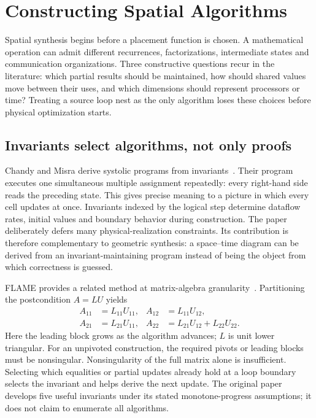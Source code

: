 \documentclass[final,3p,times,authoryear]{elsarticle}
\begin{document}
\section{Constructing Spatial Algorithms}\label{sec:constructive}
Spatial synthesis begins before a placement function is chosen. A mathematical operation can admit different recurrences, factorizations, intermediate states and communication organizations. Three constructive questions recur in the literature: which partial results should be maintained, how should shared values move between their uses, and which dimensions should represent processors or time? Treating a source loop nest as the only algorithm loses these choices before physical optimization starts.

\subsection{Invariants select algorithms, not only proofs}
Chandy and Misra derive systolic programs from invariants~\citep{chandy1986}. Their program executes one simultaneous multiple assignment repeatedly: every right-hand side reads the preceding state. This gives precise meaning to a picture in which every cell updates at once. Invariants indexed by the logical step determine dataflow rates, initial values and boundary behavior during construction. The paper deliberately defers many physical-realization constraints. Its contribution is therefore complementary to geometric synthesis: a space--time diagram can be derived from an invariant-maintaining program instead of being the object from which correctness is guessed.

FLAME provides a related method at matrix-algebra granularity~\citep{gunnels2001}. Partitioning the postcondition $A=LU$ yields
\begin{equation}\label{eq:block-lu}
\begin{aligned}
 A_{11}&=L_{11}U_{11}, & A_{12}&=L_{11}U_{12},\\
 A_{21}&=L_{21}U_{11}, & A_{22}&=L_{21}U_{12}+L_{22}U_{22}.
\end{aligned}
\end{equation}
Here the leading block grows as the algorithm advances; $L$ is unit lower triangular. For an unpivoted construction, the required pivots or leading blocks must be nonsingular. Nonsingularity of the full matrix alone is insufficient. Selecting which equalities or partial updates already hold at a loop boundary selects the invariant and helps derive the next update. The original paper develops five useful invariants under its stated monotone-progress assumptions; it does not claim to enumerate all algorithms.
\end{document}

